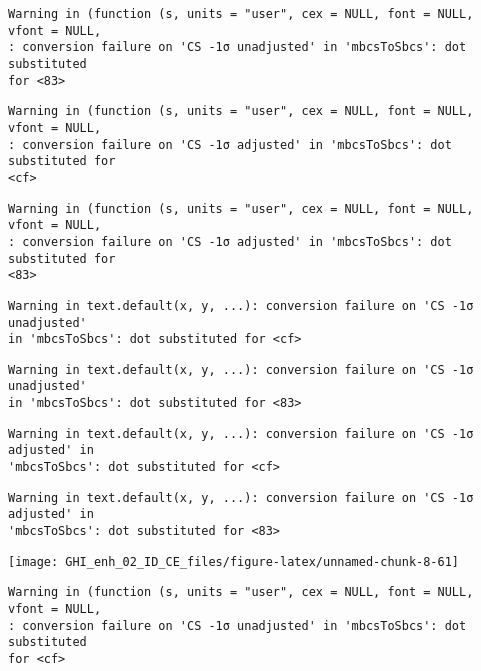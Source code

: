 \documentclass[
  10pt,
  a4paper,oneside]{article}
\begin{document}
\begin{verbatim}
Warning in (function (s, units = "user", cex = NULL, font = NULL, vfont = NULL,
: conversion failure on 'CS -1σ unadjusted' in 'mbcsToSbcs': dot substituted
for <83>
\end{verbatim}

\begin{verbatim}
Warning in (function (s, units = "user", cex = NULL, font = NULL, vfont = NULL,
: conversion failure on 'CS -1σ adjusted' in 'mbcsToSbcs': dot substituted for
<cf>
\end{verbatim}

\begin{verbatim}
Warning in (function (s, units = "user", cex = NULL, font = NULL, vfont = NULL,
: conversion failure on 'CS -1σ adjusted' in 'mbcsToSbcs': dot substituted for
<83>
\end{verbatim}

\begin{verbatim}
Warning in text.default(x, y, ...): conversion failure on 'CS -1σ unadjusted'
in 'mbcsToSbcs': dot substituted for <cf>
\end{verbatim}

\begin{verbatim}
Warning in text.default(x, y, ...): conversion failure on 'CS -1σ unadjusted'
in 'mbcsToSbcs': dot substituted for <83>
\end{verbatim}

\begin{verbatim}
Warning in text.default(x, y, ...): conversion failure on 'CS -1σ adjusted' in
'mbcsToSbcs': dot substituted for <cf>
\end{verbatim}

\begin{verbatim}
Warning in text.default(x, y, ...): conversion failure on 'CS -1σ adjusted' in
'mbcsToSbcs': dot substituted for <83>
\end{verbatim}

\begin{center}\texttt{[image: GHI\_enh\_02\_ID\_CE\_files/figure-latex/unnamed-chunk-8-61]} \end{center}

\begin{verbatim}
Warning in (function (s, units = "user", cex = NULL, font = NULL, vfont = NULL,
: conversion failure on 'CS -1σ unadjusted' in 'mbcsToSbcs': dot substituted
for <cf>
\end{verbatim}
\end{document}

